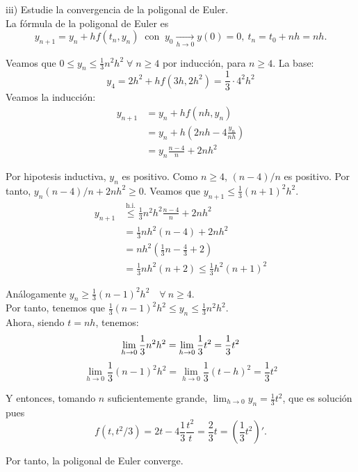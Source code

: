 \documentclass{article}
\begin{document}
iii) Estudie la convergencia de la poligonal de Euler.\\

La fórmula de la poligonal de Euler es
$$
y_{n+1} = y_n + h f(t_n, y_n) \ \text{ con } \ y_0 \underset{h\rightarrow 0}{\longrightarrow} y(0)=0, \ t_n = t_0 + nh=nh.
$$

Veamos que $0 \leq y_n \leq \frac{1}{3}n^2h^2 \; \forall \; n \geq 4$ por inducción, para $n \geq 4$. La base:\\
$$
y_4 = 2h^2 + hf(3h,2h^2) = \frac{1}{3} \cdot 4^2h^2
$$
Veamos la inducción:\\
\begin{align*}
    y_{n+1} &= y_n + h f(nh,y_n)\\
    &= y_n + h \left (2nh-4\frac{y_n}{nh} \right)\\
    &=y_n \frac{n-4}{n} + 2nh^2
\end{align*}

Por hipotesis inductiva, $y_n$ es positivo. Como $n\geq4$, $(n-4)/n$ es positivo. Por tanto, $y_n(n-4)/n+2nh^2\geq 0 $. Veamos que $y_{n+1}\leq \frac{1}{3}(n+1)^2h^2$.
\begin{align*}
    y_{n+1} & \overset{\text{h.i.}}{\leq} \frac{1}{3}n^2h^2 \frac{n-4}{n}+2nh^2\\
    & = \frac{1}{3}nh^2(n-4) + 2nh^2\\
    & = nh^2\left (\frac{1}{3}n-\frac{4}{3}+2 \right)\\
    & =\frac{1}{3} nh^2(n+2) \leq \frac{1}{3} h^2(n+1)^2
\end{align*}

Análogamente $y_n \geq \frac{1}{3} (n-1)^2h^2 \quad \forall \ n \geq 4$.\\

Por tanto, tenemos que $\frac{1}{3} (n-1)^2h^2 \leq y_n \leq \frac{1}{3} n^2h^2$. \\

Ahora, siendo $t = nh$, tenemos:
$$
\lim_{h\rightarrow0} \frac{1}{3} n^2h^2 = \lim_{h\rightarrow0} \frac{1}{3} t^2 = \frac{1}{3} t^2\\
$$
$$
\lim_{h\rightarrow0} \frac{1}{3} (n-1)^2h^2 = \lim_{h\rightarrow0} \frac{1}{3} (t - h)^2 = \frac{1}{3} t^2
$$

Y entonces, tomando $n$ suficientemente grande, $\lim_{h\rightarrow0} y_n = \frac{1}{3} t^2$, que es solución pues 
$$
f(t,t^2/3) = 2t-4 \frac{1}{3} \frac{t^2}{t} = \frac{2}{3} t = \left ( \frac{1}{3}t^2 \right )'.
$$

Por tanto, la poligonal de Euler converge.
\end{document}
